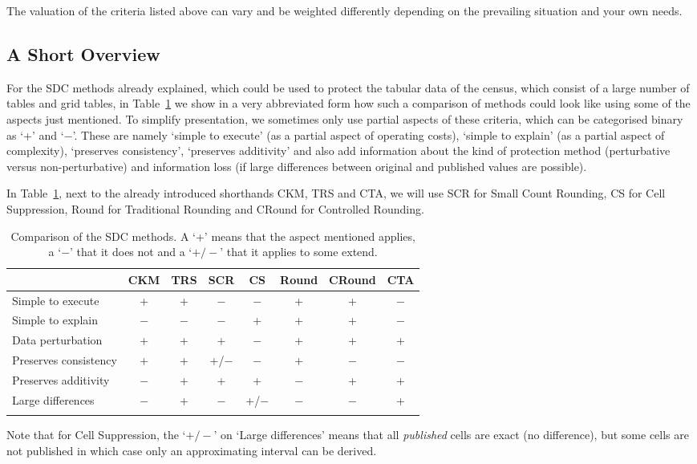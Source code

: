 The valuation of the criteria listed above can vary and be weighted differently depending on the prevailing situation and your own needs.


\subsection{A Short Overview}
For the SDC methods already explained, which could be used to protect the tabular data of the census, which consist of a large number of tables and grid tables, in Table~\ref{table:comp_sdc_methods} we show in a very abbreviated form how such a comparison of methods could look like using some of the aspects just mentioned. To simplify presentation, we sometimes only use partial aspects of these criteria, which can be categorised binary as ‘+’ and ‘$-$’. These are namely ‘simple to execute’ (as a partial aspect of operating costs), ‘simple to explain’ (as a partial aspect of complexity), ‘preserves consistency’, ‘preserves additivity’ and also add information about the kind of protection method (perturbative versus non-perturbative) and information loss (if large differences between original and published values are possible).

In Table~\ref{table:comp_sdc_methods}, next to the already introduced shorthands CKM, TRS and CTA, we will use SCR for Small Count Rounding, CS for Cell Suppression, Round for Traditional Rounding and CRound for Controlled Rounding.

\begin{table}[!th]
\begin{adjustbox}{max height=8cm,max width=\linewidth,keepaspectratio}
\begin{tabular}{lccccccc}
  & CKM & TRS & SCR & CS & Round & CRound & CTA \\
\hline
Simple to execute       & + & + & $-$ & $-$ & + & + & $-$ \\
Simple to explain       & $-$ & $-$ & $-$ & + & + & + & $-$ \\
Data perturbation       & + & + & + & $-$ & + & + & + \\
Preserves consistency   & + & + & +/$-$ & $-$ & + & $-$ & $-$ \\
Preserves additivity    & $-$ & + & + & + & $-$ & + & + \\
Large differences       & $-$ & + & $-$ & +/$-$ & $-$ & $-$ & + \\
\hline\\
\end{tabular}
\end{adjustbox}
\caption{Comparison of the SDC methods. A `+' means that the aspect mentioned applies, a `$-$' that it does not and a `$+/-$' that it applies to some extend.}
\label{table:comp_sdc_methods}
\end{table}
Note that for Cell Suppression, the `$+/-$' on `Large differences' means that all \emph{published} cells are exact (no difference), but some cells are not published in which case only an approximating interval can be derived.

